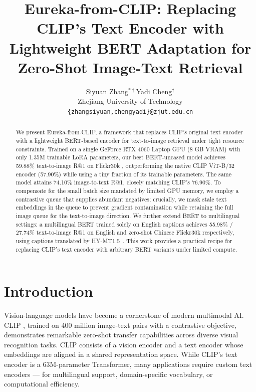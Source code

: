 \documentclass[10pt,leqno]{amsart}
\begin{document}
\title{Eureka-from-CLIP: Replacing CLIP's Text Encoder with Lightweight BERT Adaptation for Zero-Shot Image-Text Retrieval}

\author{Siyuan Zhang$^{*\dagger}$\quad Yadi Cheng$^{\dagger}$\\[4pt]
  \small Zhejiang University of Technology\\
  \small\texttt{\{zhangsiyuan,chengyadi\}@zjut.edu.cn}}


\maketitle

\let\thefootnote\relax
{}

\begin{abstract}
We present Eureka-from-CLIP, a framework that replaces CLIP's original text encoder with a lightweight BERT-based encoder for text-to-image retrieval under tight resource constraints. Trained on a single GeForce RTX 4060 Laptop GPU (8 GB VRAM) with only 1.35M trainable LoRA \citep{hu2022lora} parameters, our best BERT-uncased model achieves 59.88\% text-to-image R@1 on Flickr30k \citep{plummer2015flickr30k}, outperforming the native CLIP ViT-B/32 encoder (57.90\%) while using a tiny fraction of its trainable parameters. The same model attains 74.10\% image-to-text R@1, closely matching CLIP's 76.90\%. To compensate for the small batch size mandated by limited GPU memory, we employ a contrastive queue that supplies abundant negatives; crucially, we mask stale text embeddings in the queue to prevent gradient contamination while retaining the full image queue for the text-to-image direction. We further extend BERT to multilingual settings: a multilingual BERT trained solely on English captions achieves 55.98\% / 27.74\% text-to-image R@1 on English and zero-shot Chinese Flickr30k respectively, using captions translated by HY-MT1.5~\citep{hymt152025tencent}. This work provides a practical recipe for replacing CLIP's text encoder with arbitrary BERT variants under limited compute.
\end{abstract}

\bigskip

\section{Introduction}

Vision-language models have become a cornerstone of modern multimodal AI. CLIP \citep{radford2021clip}, trained on 400 million image-text pairs with a contrastive objective, demonstrates remarkable zero-shot transfer capabilities across diverse visual recognition tasks. CLIP consists of a vision encoder and a text encoder whose embeddings are aligned in a shared representation space. While CLIP's text encoder is a 63M-parameter Transformer, many applications require custom text encoders --- for multilingual support, domain-specific vocabulary, or computational efficiency.
\end{document}
